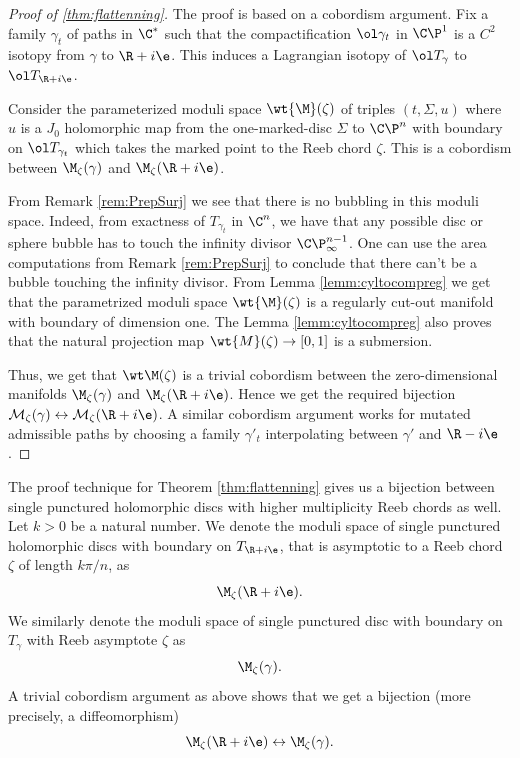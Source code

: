 \begin{proof}[Proof of \ref{thm:flattenning}]

The proof is based on a cobordism argument. Fix a family $\gamma_t$ of paths in $\C^*$ such that the compactification $\ol \gamma_t$ in $\C\P^1$ is a $C^2$ isotopy from $\gamma$ to $\R + i\e$. This induces a Lagrangian isotopy of $\ol T_{\gamma}$ to $\ol T_{\R + i\e}$. 

Consider the parameterized moduli space $\wt {\M} (\zeta)$ of triples $(t,\Sigma,u)$ where $u$ is a $J_0$ holomorphic map from the one-marked-disc $\Sigma$ to $\C\P^n$ with boundary on $\ol T_{\gamma_t}$ which takes the marked point to the Reeb chord $\zeta$. This is a cobordism between $\M_\zeta (\gamma)$ and $\M_\zeta(\R + i\e)$.

From Remark \ref{rem:PrepSurj} we see that there is no bubbling in this moduli space. Indeed, from exactness of $T_{\gamma_t}$ in $\C^n$, we have that any possible disc or sphere bubble has to touch the infinity divisor $\C\P^{n-1}_\infty$. One can use the area computations from Remark \ref{rem:PrepSurj} to conclude that there can't be a bubble touching the infinity divisor. From Lemma \ref{lemm:cyltocompreg} we get that the parametrized moduli space $\wt {\M}(\zeta)$ is a regularly cut-out manifold with boundary of dimension one. The Lemma \ref{lemm:cyltocompreg} also proves that the natural projection map $\wt {M}(\zeta) \to [0,1]$ is a submersion.

Thus, we get that $\wt \M (\zeta)$ is a trivial  cobordism between the zero-dimensional manifolds $\M_\zeta (\gamma)$ and $\M_\zeta(\R + i\e)$. Hence we get the required bijection $\mathcal M_\zeta{(\gamma)} \leftrightarrow \mathcal M_\zeta{(\R + i\e)}$. A similar cobordism argument works for mutated admissible paths by choosing a family $\gamma'_t$ interpolating between $\gamma'$ and $\R - i\e$.


\end{proof}

\begin{remark}
    \label{rem:genflatt}
The proof technique for Theorem \ref{thm:flattenning} gives us a bijection between single punctured holomorphic discs with higher multiplicity Reeb chords as well. Let $k>0$ be a natural number. We denote the moduli space of single punctured holomorphic discs with boundary on $T_{\R+i\e}$, that is asymptotic to a Reeb chord $\zeta$ of length $k\pi/n$, as $$\M_{\zeta}(\R+i\e).$$ We similarly denote the moduli space of single punctured disc with boundary on $T_{\gamma}$ with Reeb asymptote $\zeta$  as $$\M_{\zeta}(\gamma).$$ A trivial cobordism argument as above shows that we get a bijection (more precisely, a diffeomorphism) $$\M_\zeta(\R + i\e ) \leftrightarrow \M_\zeta (\gamma).$$  


\end{remark}



